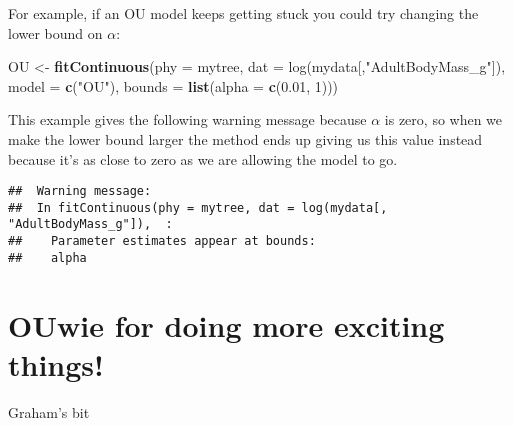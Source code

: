\documentclass[11pt]{article}
\newcommand{\KeywordTok}[1]{\textcolor[rgb]{0.13,0.29,0.53}{\textbf{{#1}}}}
\newcommand{\DataTypeTok}[1]{\textcolor[rgb]{0.13,0.29,0.53}{{#1}}}
\newcommand{\DecValTok}[1]{\textcolor[rgb]{0.00,0.00,0.81}{{#1}}}
\newcommand{\CharTok}[1]{\textcolor[rgb]{0.31,0.60,0.02}{{#1}}}
\newcommand{\StringTok}[1]{\textcolor[rgb]{0.31,0.60,0.02}{{#1}}}
\newcommand{\NormalTok}[1]{{#1}}
\begin{document}
For example, if an OU model keeps getting stuck you could try changing the lower bound on $\alpha$:

\begin{snugshade}
\begin{Highlighting}[]
\NormalTok{OU <-}\StringTok{ }\KeywordTok{fitContinuous}\NormalTok{(\DataTypeTok{phy = }mytree, \DataTypeTok{dat = }log(mydata[,"AdultBodyMass_g"]),} 
                    \DataTypeTok{model = }\KeywordTok{c}\NormalTok{(}\StringTok{"}\CharTok{OU}\StringTok{"}\NormalTok{), }\DataTypeTok{bounds = }\KeywordTok{list}\NormalTok{(}\DataTypeTok{alpha = }\KeywordTok{c}\NormalTok{(}\DecValTok{0.01}\NormalTok{, }\DecValTok{1}\NormalTok{)))}

\end{Highlighting}
\end{snugshade}

This example gives the following warning message because $\alpha$ is zero, so when we make the lower bound larger the method ends up giving us this value instead because it's as close to zero as we are allowing the model to go.

\begin{verbatim}
##  Warning message:
##  In fitContinuous(phy = mytree, dat = log(mydata[, "AdultBodyMass_g"]),  :
##    Parameter estimates appear at bounds:
##    alpha
\end{verbatim}

\section{OUwie for doing more exciting things!}

Graham's bit

\newpage


\end{document}
